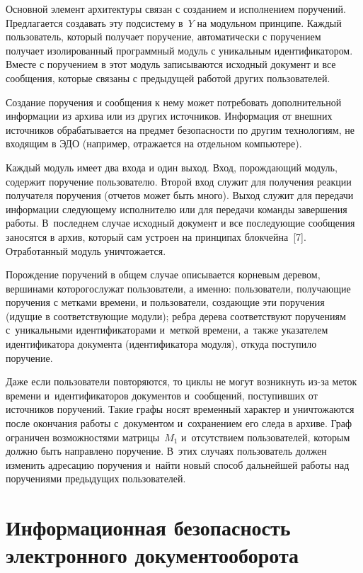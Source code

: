 \begin{multicols}{2}
  Основной элемент архитектуры связан с созданием и исполнением поручений. 
Предлагается создавать эту подсистему в~$Y$ на модульном принципе. Каждый 
пользователь, который получает поручение, автоматически с поручением получает 
изолированный программный модуль с уникальным идентификатором. Вместе с 
поручением в этот модуль записываются исходный документ и все сообщения, 
которые связаны с предыдущей работой других пользователей. 
  
  Создание поручения и сообщения к нему может потребовать дополнительной 
информации из архива или из других источников. Информация от внешних 
источников обрабатывается на предмет безопасности по другим технологиям, не 
входящим в ЭДО (например, отражается на отдельном компьютере). 
  
  Каждый модуль имеет два входа и один выход. Вход, порождающий модуль, 
содержит поручение пользователю. Второй вход служит для получения реакции 
получателя поручения (отчетов может быть много). Выход служит для передачи 
информации следующему исполнителю или для передачи команды завершения 
работы. В~последнем случае исходный документ и все последующие сообщения 
заносятся в архив, который сам устроен на принципах блокчейна~[7]. 
Отработанный модуль уничтожается.
  
  Порождение поручений в общем случае описывается корневым деревом, 
вершинами которого\linebreak служат пользователи, а именно: пользователи, получающие 
поручения с метками времени, и пользователи, создающие эти поручения (идущие 
в соответствующие модули); ребра дерева \mbox{соответствуют} поручениям 
с~уникальными идентификаторами и~меткой времени, а~также указателем 
идентификатора документа (идентификатора модуля), откуда поступило 
поручение. 
  
  Даже если пользователи повторяются, то цик\-лы не могут возникнуть из-за 
меток времени и~идентификаторов документов и~сообщений, поступивших от 
источников поручений. Такие графы носят временный характер и уничтожаются 
после окончания работы с~документом и~сохранением его следа в архиве. Граф 
ограничен возможностями мат\-ри\-цы~$M_1$ и~отсутствием пользователей, 
которым должно быть направлено поручение. В~этих случаях пользователь 
должен изменить адресацию поручения и~найти новый способ дальнейшей работы 
над поручениями предыду\-щих пользователей. 

\vspace*{-6pt}
  
  \section{Информационная безопасность электронного документооборота}
  

\end{multicols}
